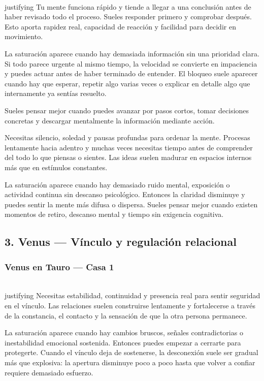 \documentclass[11pt,a4paper]{article}
\begin{document}
\\justifying
Tu mente funciona rápido y tiende a llegar a una conclusión antes de haber revisado todo el proceso. Sueles responder primero y comprobar después. Esto aporta rapidez real, capacidad de reacción y facilidad para decidir en movimiento.

La saturación aparece cuando hay demasiada información sin una prioridad clara. Si todo parece urgente al mismo tiempo, la velocidad se convierte en impaciencia y puedes actuar antes de haber terminado de entender. El bloqueo suele aparecer cuando hay que esperar, repetir algo varias veces o explicar en detalle algo que internamente ya sentías resuelto.

Sueles pensar mejor cuando puedes avanzar por pasos cortos, tomar decisiones concretas y descargar mentalmente la información mediante acción.

Necesitas silencio, soledad y pausas profundas para ordenar la mente. Procesas lentamente hacia adentro y muchas veces necesitas tiempo antes de comprender del todo lo que piensas o sientes. Las ideas suelen madurar en espacios internos más que en estímulos constantes.

La saturación aparece cuando hay demasiado ruido mental, exposición o actividad continua sin descanso psicológico. Entonces la claridad disminuye y puedes sentir la mente más difusa o dispersa. Sueles pensar mejor cuando existen momentos de retiro, descanso mental y tiempo sin exigencia cognitiva.

\vspace{0.8cm}

\subsection{3. Venus — Vínculo y regulación relacional}

\subsubsection*{Venus en Tauro — Casa 1}

\\justifying
Necesitas estabilidad, continuidad y presencia real para sentir seguridad en el vínculo. Las relaciones suelen construirse lentamente y fortalecerse a través de la constancia, el contacto y la sensación de que la otra persona permanece.

La saturación aparece cuando hay cambios bruscos, señales contradictorias o inestabilidad emocional sostenida. Entonces puedes empezar a cerrarte para protegerte. Cuando el vínculo deja de sostenerse, la desconexión suele ser gradual más que explosiva: la apertura disminuye poco a poco hasta que volver a confiar requiere demasiado esfuerzo.
\end{document}
